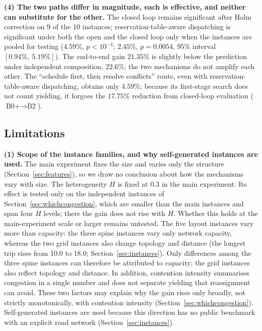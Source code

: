 \documentclass[manuscript,screen,review]{acmart}
\newcommand{\NCases}{10}
\newcommand{\GainLoopProbe}{17.75\%}     %
\newcommand{\GainProbeOpen}{4.59\%}      %
\newcommand{\PProbeOpen}{<10^{-4}}
\newcommand{\GainProbeLoop}{2.45\%}      %
\newcommand{\PProbeLoop}{=0.0054}
\newcommand{\GainEndToEnd}{21.35\%}      %
\newcommand{\CIProbeLoop}{$[0.94\%,\ 5.19\%]$}
\newcommand{\GainIndepProduct}{22.6\%}
\newcommand{\CellsSigLoopAdj}{9}
\newcommand{\LegDumbbell}{10.0}          %
\newcommand{\LegGrid}{18.0}              %
\begin{document}
\textbf{(4) The two paths differ in magnitude, each is effective, and neither can substitute for the other.}
The closed loop remains significant after Holm correction on \CellsSigLoopAdj{} of the $\NCases$ instances; reservation-table-aware dispatching is significant under both the open and the closed loop only when the instances are pooled for testing ($\GainProbeOpen$, $p\PProbeOpen$; $\GainProbeLoop$, $p\PProbeLoop$, $95\%$ interval \CIProbeLoop{}).
The end-to-end gain $\GainEndToEnd$ is slightly below the prediction under independent composition, $\GainIndepProduct$; the two mechanisms do not amplify each other.
The ``schedule first, then resolve conflicts'' route, even with reservation-table-aware dispatching, obtains only $\GainProbeOpen$; because its first-stage search does not count yielding, it forgoes the $\GainLoopProbe$ reduction from closed-loop evaluation ($\text{B0+}\to\text{B2}$).


\subsection{Limitations}
\label{sec:limitations}

\textbf{(1) Scope of the instance families, and why self-generated instances are used.}
The main experiment fixes the size and varies only the structure (Section~\ref{sec:features}), so we draw no conclusion about how the mechanisms vary with size. The heterogeneity $H$ is fixed at $0.3$ in the main experiment. Its effect is tested only on the independent instances of Section~\ref{sec:whichcongestion}, which are smaller than the main instances and span four $H$ levels; there the gain does not rise with $H$. Whether this holds at the main-experiment scale or larger remains untested.
The five layout instances vary more than capacity: the three spine instances vary only network capacity, whereas the two grid instances also change topology and distance (the longest trip rises from \LegDumbbell{} to \LegGrid{}; Section~\ref{sec:instances}).
Only differences among the three spine instances can therefore be attributed to capacity; the grid instances also reflect topology and distance. In addition, contention intensity summarises congestion in a single number and does not separate yielding that reassignment can avoid. These two factors may explain why the gain rises only broadly, not strictly monotonically, with contention intensity (Section~\ref{sec:whichcongestion}).
Self-generated instances are used because this direction has no public benchmark with an explicit road network (Section~\ref{sec:instances}).
\end{document}

